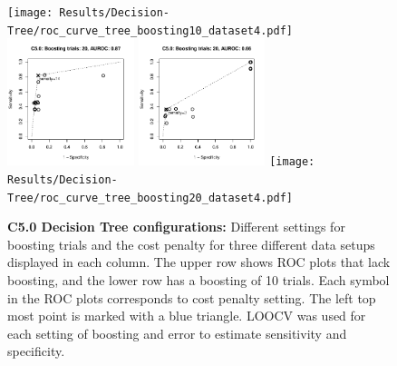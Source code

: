 \documentclass{article}
\begin{document}
\begin{figure}
  \texttt{[image: Results/Decision-Tree/roc\_curve\_tree\_boosting10\_dataset4.pdf]} \\
  \includegraphics[width=0.33\textwidth]{Results/Decision-Tree/roc_curve_tree_boosting20_dataset1.pdf}\hspace{-0.3cm}
  \includegraphics[width=0.33\textwidth]{Results/Decision-Tree/roc_curve_tree_boosting20_dataset2.pdf}\hspace{-0.3cm}
  \texttt{[image: Results/Decision-Tree/roc\_curve\_tree\_boosting20\_dataset4.pdf]} 
\caption{\label{fig:decisiontree_error_boosting}\textbf{C5.0 Decision Tree configurations:} Different settings for boosting trials and the cost penalty for three different data setups displayed in each column. The upper row shows ROC plots that lack boosting, and the lower row has a boosting of 10 trials. Each symbol in the ROC plots corresponds to cost penalty setting. The left top most point is marked with a blue triangle. LOOCV was used for each setting of boosting and error to estimate sensitivity and specificity. }
\end{figure}
\end{document}
